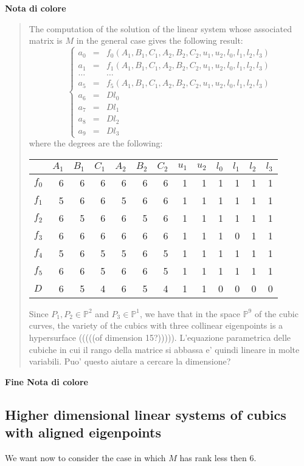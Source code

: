 \documentclass{amsart}
\theoremstyle{plain}
\theoremstyle{definition}
\begin{document}
\noindent
\textbf{Nota di colore}
\begin{quote}
The computation of the solution of the linear system whose associated
matrix is $M$ in the general case gives the following
result:
\[
\left\{
\begin{array}{rcl}
  a_0 & = & f_0(A_1, B_1, C_1, A_2, B_2, C_2, u_1, u_2, l_0, l_1, l_2, l_3) \\
  a_1 & = & f_1(A_1, B_1, C_1, A_2, B_2, C_2, u_1, u_2, l_0, l_1, l_2, l_3) \\
  \dots & & \dots \\
  a_5 & = & f_5(A_1, B_1, C_1, A_2, B_2, C_2, u_1, u_2, l_0, l_1, l_2, l_3) \\
  a_6 & = & D l_0\\
  a_7 & = & D l_1\\
  a_8 & = & D l_2\\
  a_9 &=& D l_3
\end{array}
\right.
\]
where the degrees are the following:

\begin{tabular}{|l|rrrrrrrrrrrr|} \hline
  & $A_{1}$ & $B_{1}$ & $C_{1}$ & $A_{2}$ & $B_{2}$ & $C_{2}$ &
  $u_{1}$ & $u_{2}$ & $l_0$ & $l_1$ & $l_2$ & $l_3$ \\ \hline
$f_0$& 6 & 6 & 6 & 6 & 6 & 6 & 1 & 1 & 1 & 1 & 1 & 1 \\
$f_1$& 5 & 6 & 6 & 5 & 6 & 6 & 1 & 1 & 1 & 1 & 1 & 1 \\
$f_2$& 6 & 5 & 6 & 6 & 5 & 6 & 1 & 1 & 1 & 1 & 1 & 1 \\
$f_3$& 6 & 6 & 6 & 6 & 6 & 6 & 1 & 1 & 1 & 0 & 1 & 1 \\
$f_4$& 5 & 6 & 5 & 5 & 6 & 5 & 1 & 1 & 1 & 1 & 1 & 1 \\
$f_5$& 6 & 6 & 5 & 6 & 6 & 5 & 1 & 1 & 1 & 1 & 1 & 1 \\
$D$& 6 & 5 & 4 & 6 & 5 & 4 & 1 & 1 & 0 & 0 & 0 & 0 \\ \hline
\end{tabular}

Since $P_1, P_2 \in \mathbb{P}^2$ and $P_3 \in
\mathbb{P}^1$, we have that in the space $\mathbb{P}^9$ of the cubic
curves, the variety of the cubics with three collinear eigenpoints is
a hypersurface (((((of dimension 15?))))).
L'equazione parametrica delle cubiche in cui il rango della matrice si
abbassa e' quindi lineare in molte variabili. Puo' questo aiutare a cercare
la dimensione?
\end{quote}
\textbf{Fine Nota di colore}

\subsection{Higher dimensional linear systems of cubics with aligned eigenpoints}
We want now to consider the case in which $M$ has rank less then $6$.
\end{document}
